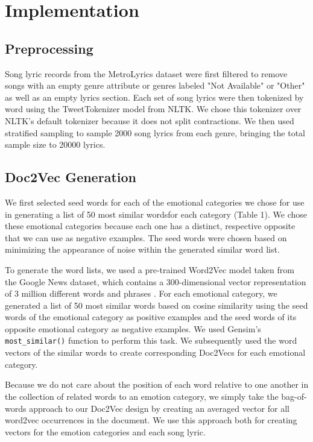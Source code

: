 \documentclass[10pt,twocolumn]{article}
\begin{document}
\section{Implementation}
\subsection{Preprocessing}

Song lyric records from the MetroLyrics dataset were first filtered to remove songs with an empty genre attribute or genres labeled "Not Available" or "Other" as well as an empty lyrics section.  Each set of song lyrics were then tokenized by word using the TweetTokenizer model from NLTK.  We chose this tokenizer over NLTK's default tokenizer because it does not split contractions.  We then used stratified sampling to sample 2000 song lyrics from each genre, bringing the total sample size to 20000 lyrics.  

\subsection{Doc2Vec Generation}

We first selected seed words for each of the emotional categories we chose for use in generating a list of 50 most similar wordsfor each category (Table 1).  We chose these emotional categories because each one has a distinct, respective opposite that we can use as negative examples.  The seed words were chosen based on minimizing the appearance of noise within the generated similar word list.

To generate the word lists, we used a pre-trained Word2Vec model taken from the Google News dataset, which contains a 300-dimensional vector representation of 3 million different words and phrases \cite{a6}.  For each emotional category, we generated a list of 50 most similar words based on cosine similarity using the seed words of the emotional category as positive examples and the seed words of its opposite emotional category as negative examples.  We used Gensim's \texttt{most\_similar()} function to perform this task.  We subsequently used the word vectors of the similar words to create corresponding Doc2Vecs for each emotional category.

Because we do not care about the position of each word relative to one another in the collection of related words to an emotion category, we simply take the bag-of-words approach to our Doc2Vec design by creating an averaged vector for all word2vec occurrences in the document.  We use this approach both for creating vectors for the emotion categories and each song lyric.
\end{document}
